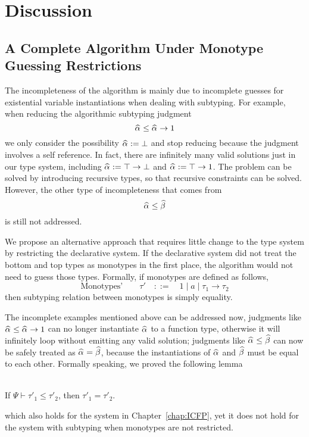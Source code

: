 
\section{Discussion}


\subsection{A Complete Algorithm Under Monotype Guessing Restrictions}

The incompleteness of the algorithm is mainly due to incomplete guesses
for existential variable instantiations when dealing with subtyping.
For example, when reducing the algorithmic subtyping judgment
$$\al \le \al \to 1$$
we only consider the possibility $\al := \bot$
and stop reducing because the judgment involves a self reference.
In fact, there are infinitely many valid solutions just in our type system,
including $\al := \top \to \bot$ and $\al := \top \to 1$.
The problem can be solved by introducing recursive types,
so that recursive constraints can be solved.
However, the other type of incompleteness that comes from
$$\al \le \bt$$
is still not addressed.

We propose an alternative approach that requires little change to the type system
by restricting the declarative system.
If the declarative system did not treat the bottom and top types
as monotypes in the first place,
the algorithm would not need to guess those types.
Formally, if monotypes are defined as follows,
$$\text{Monotypes'}\qquad \tau' \quad  ::= \quad 1 \mid a \mid \tau_1\to \tau_2$$
then subtyping relation between monotypes is simply equality.

The incomplete examples mentioned above can be addressed now,
judgments like $\al \le \al \to 1$ can no longer instantiate $\al$ to a function type,
otherwise it will infinitely loop without emitting any valid solution;
judgments like $\al \le \bt$ can now be safely treated as $\al = \bt$,
because the instantiations of $\al$ and $\bt$ must be equal to each other.
Formally speaking, we proved the following lemma
\begin{lemma}~\\
    If $\Psi \vdash \tau'_1 \le \tau'_2$, then $\tau'_1 = \tau'_2$.
\end{lemma}
which also holds for the system in Chapter~\ref{chap:ICFP},
yet it does not hold for the system with subtyping when monotypes are not restricted.

